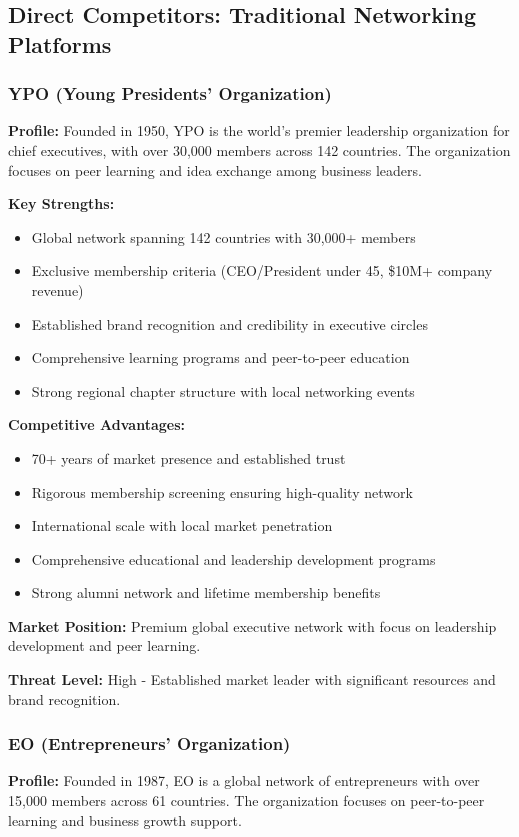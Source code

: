 \subsection{Direct Competitors: Traditional Networking Platforms}

\subsubsection{YPO (Young Presidents' Organization)}
\textbf{Profile:} Founded in 1950, YPO is the world's premier leadership organization for chief executives, with over 30,000 members across 142 countries. The organization focuses on peer learning and idea exchange among business leaders.

\textbf{Key Strengths:}
\begin{itemize}
    \item Global network spanning 142 countries with 30,000+ members
    \item Exclusive membership criteria (CEO/President under 45, \$10M+ company revenue)
    \item Established brand recognition and credibility in executive circles
    \item Comprehensive learning programs and peer-to-peer education
    \item Strong regional chapter structure with local networking events
\end{itemize}

\textbf{Competitive Advantages:}
\begin{itemize}
    \item 70+ years of market presence and established trust
    \item Rigorous membership screening ensuring high-quality network
    \item International scale with local market penetration
    \item Comprehensive educational and leadership development programs
    \item Strong alumni network and lifetime membership benefits
\end{itemize}

\textbf{Market Position:} Premium global executive network with focus on leadership development and peer learning.

\textbf{Threat Level:} High - Established market leader with significant resources and brand recognition.

\subsubsection{EO (Entrepreneurs' Organization)}
\textbf{Profile:} Founded in 1987, EO is a global network of entrepreneurs with over 15,000 members across 61 countries. The organization focuses on peer-to-peer learning and business growth support.

